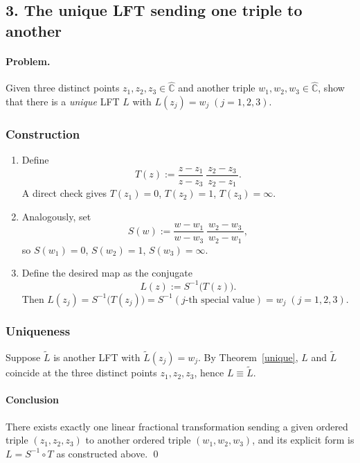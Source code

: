 \documentclass[12pt]{article}
\theoremstyle{definition} %
\theoremstyle{plain} %
\begin{document}
\subsection*{3.\; The unique LFT sending one triple to another}

\paragraph{Problem.}
Given three distinct points $z_{1},z_{2},z_{3}\in\widehat{\mathbb C}$
and another triple $w_{1},w_{2},w_{3}\in\widehat{\mathbb C}$, show that
there is a \emph{unique} LFT $L$ with
\(
   L(z_{j})=w_{j}\;(j=1,2,3).
\)

\subsubsection*{Construction}

\begin{enumerate}
   \item\label{Tdef}
         Define
         \[
             T(z):=\frac{z-z_{1}}{z-z_{3}}\,
                   \frac{\,z_{2}-z_{3}\,}{\,z_{2}-z_{1}\,}.
         \]
         A direct check gives $T(z_{1})=0$, $T(z_{2})=1$, $T(z_{3})=\infty$.
   \item\label{Sdef}
         Analogously, set
         \[
             S(w):=\frac{w-w_{1}}{w-w_{3}}\,
                   \frac{\,w_{2}-w_{3}\,}{\,w_{2}-w_{1}\,},
         \]
         so $S(w_{1})=0$, $S(w_{2})=1$, $S(w_{3})=\infty$.
   \item\label{Ldef}
         Define the desired map as the conjugate
         \[
             L(z):=S^{-1}\!\bigl(T(z)\bigr).
         \]
         Then
         \(
            L(z_{j})=S^{-1}\!\bigl(T(z_{j})\bigr)=S^{-1}(j\text{-th special value})
                    =w_{j}\;(j=1,2,3).
         \)
\end{enumerate}

\subsubsection*{Uniqueness}

Suppose $\tilde{L}$ is another LFT with $\tilde{L}(z_{j})=w_{j}$.
By Theorem~\ref{unique}, $L$ and $\tilde{L}$ coincide at the three
distinct points $z_{1},z_{2},z_{3}$, hence $L\equiv\tilde{L}$.

\paragraph{Conclusion}
There exists exactly one linear fractional transformation sending a
given ordered triple $(z_{1},z_{2},z_{3})$ to another ordered triple
$(w_{1},w_{2},w_{3})$, and its explicit form is $L=S^{-1}\circ T$ as
constructed above.
\qed
\end{document}
